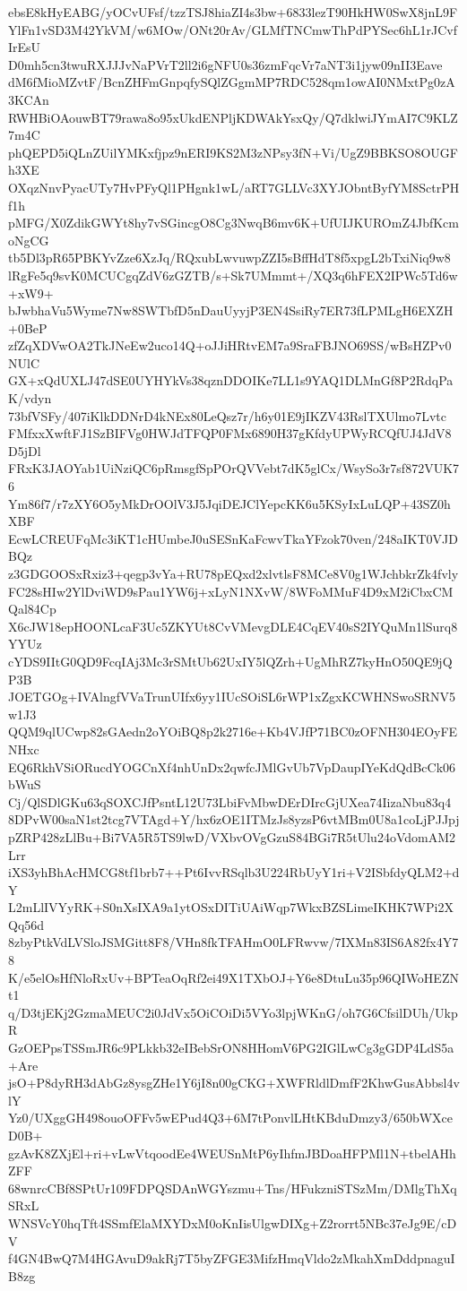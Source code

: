 ebsE8kHyEABG/yOCvUFsf/tzzTSJ8hiaZI4s3bw+6833lezT90HkHW0SwX8jnL9F
YlFn1vSD3M42YkVM/w6MOw/ONt20rAv/GLMfTNCmwThPdPYSec6hL1rJCvfIrEsU
D0mh5cn3twuRXJJJvNaPVrT2ll2i6gNFU0s36zmFqcVr7aNT3i1jyw09nII3Eave
dM6fMioMZvtF/BcnZHFmGnpqfySQlZGgmMP7RDC528qm1owAI0NMxtPg0zA3KCAn
RWHBiOAouwBT79rawa8o95xUkdENPljKDWAkYsxQy/Q7dklwiJYmAI7C9KLZ7m4C
phQEPD5iQLnZUilYMKxfjpz9nERI9KS2M3zNPsy3fN+Vi/UgZ9BBKSO8OUGFh3XE
OXqzNnvPyacUTy7HvPFyQl1PHgnk1wL/aRT7GLLVc3XYJObntByfYM8SctrPHf1h
pMFG/X0ZdikGWYt8hy7vSGincgO8Cg3NwqB6mv6K+UfUIJKUROmZ4JbfKcmoNgCG
tb5Dl3pR65PBKYvZze6XzJq/RQxubLwvuwpZZI5sBffHdT8f5xpgL2bTxiNiq9w8
lRgFe5q9svK0MCUCgqZdV6zGZTB/s+Sk7UMmmt+/XQ3q6hFEX2IPWc5Td6w+xW9+
bJwbhaVu5Wyme7Nw8SWTbfD5nDauUyyjP3EN4SsiRy7ER73fLPMLgH6EXZH+0BeP
zfZqXDVwOA2TkJNeEw2uco14Q+oJJiHRtvEM7a9SraFBJNO69SS/wBsHZPv0NUlC
GX+xQdUXLJ47dSE0UYHYkVs38qznDDOIKe7LL1s9YAQ1DLMnGf8P2RdqPaK/vdyn
73bfVSFy/407iKlkDDNrD4kNEx80LeQsz7r/h6y01E9jIKZV43RslTXUlmo7Lvtc
FMfxxXwftFJ1SzBIFVg0HWJdTFQP0FMx6890H37gKfdyUPWyRCQfUJ4JdV8D5jDl
FRxK3JAOYab1UiNziQC6pRmsgfSpPOrQVVebt7dK5glCx/WsySo3r7sf872VUK76
Ym86f7/r7zXY6O5yMkDrOOlV3J5JqiDEJClYepcKK6u5KSyIxLuLQP+43SZ0hXBF
EcwLCREUFqMc3iKT1cHUmbeJ0uSESnKaFcwvTkaYFzok70ven/248aIKT0VJDBQz
z3GDGOOSxRxiz3+qegp3vYa+RU78pEQxd2xlvtlsF8MCe8V0g1WJchbkrZk4fvly
FC28sHIw2YlDviWD9sPau1YW6j+xLyN1NXvW/8WFoMMuF4D9xM2iCbxCMQal84Cp
X6cJW18epHOONLcaF3Uc5ZKYUt8CvVMevgDLE4CqEV40sS2IYQuMn1lSurq8YYUz
cYDS9IItG0QD9FcqIAj3Mc3rSMtUb62UxIY5lQZrh+UgMhRZ7kyHnO50QE9jQP3B
JOETGOg+IVAlngfVVaTrunUIfx6yy1IUcSOiSL6rWP1xZgxKCWHNSwoSRNV5w1J3
QQM9qlUCwp82sGAedn2oYOiBQ8p2k2716e+Kb4VJfP71BC0zOFNH304EOyFENHxc
EQ6RkhVSiORucdYOGCnXf4nhUnDx2qwfcJMlGvUb7VpDaupIYeKdQdBcCk06bWuS
Cj/QlSDlGKu63qSOXCJfPsntL12U73LbiFvMbwDErDIrcGjUXea74IizaNbu83q4
8DPvW00saN1st2tcg7VTAgd+Y/hx6zOE1ITMzJs8yzsP6vtMBm0U8a1coLjPJJpj
pZRP428zLlBu+Bi7VA5R5TS9lwD/VXbvOVgGzuS84BGi7R5tUlu24oVdomAM2Lrr
iXS3yhBhAcHMCG8tf1brb7++Pt6IvvRSqlb3U224RbUyY1ri+V2ISbfdyQLM2+dY
L2mLlIVYyRK+S0nXsIXA9a1ytOSxDITiUAiWqp7WkxBZSLimeIKHK7WPi2XQq56d
8zbyPtkVdLVSloJSMGitt8F8/VHn8fkTFAHmO0LFRwvw/7IXMn83IS6A82fx4Y78
K/e5elOsHfNloRxUv+BPTeaOqRf2ei49X1TXbOJ+Y6e8DtuLu35p96QIWoHEZNt1
q/D3tjEKj2GzmaMEUC2i0JdVx5OiCOiDi5VYo3lpjWKnG/oh7G6CfsilDUh/UkpR
GzOEPpsTSSmJR6c9PLkkb32eIBebSrON8HHomV6PG2IGlLwCg3gGDP4LdS5a+Are
jsO+P8dyRH3dAbGz8ysgZHe1Y6jI8n00gCKG+XWFRldlDmfF2KhwGusAbbsl4vlY
Yz0/UXggGH498ouoOFFv5wEPud4Q3+6M7tPonvlLHtKBduDmzy3/650bWXceD0B+
gzAvK8ZXjEl+ri+vLwVtqoodEe4WEUSnMtP6yIhfmJBDoaHFPMl1N+tbelAHhZFF
68wnrcCBf8SPtUr109FDPQSDAnWGYszmu+Tns/HFukzniSTSzMm/DMlgThXqSRxL
WNSVcY0hqTft4SSmfElaMXYDxM0oKnIisUlgwDIXg+Z2rorrt5NBc37eJg9E/cDV
f4GN4BwQ7M4HGAvuD9akRj7T5byZFGE3MifzHmqVldo2zMkahXmDddpnaguIB8zg
